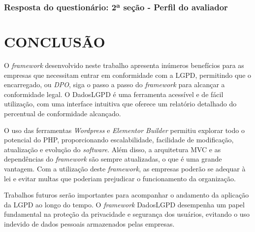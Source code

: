\documentclass[
	12pt,				%
	openright,			%
	oneside,			%
	a4paper,			%
	english,			%
	french,				%
	spanish,			%
	brazil,				%
	]{abntex2}
\begin{document}
 \subsection{Resposta do questionário: 2ª seção - Perfil do avaliador}







 \chapter{CONCLUSÃO}
 \label{ch: conclusao}
O \textit{framework} desenvolvido neste trabalho apresenta inúmeros benefícios para as empresas que necessitam entrar em conformidade com a LGPD, permitindo que o encarregado, ou \textit{DPO}, siga o passo a passo do \textit{framework} para alcançar a conformidade legal. O DadosLGPD é uma ferramenta acessível e de fácil utilização, com uma interface intuitiva que oferece um relatório detalhado do percentual de conformidade alcançado.

O uso das ferramentas \textit{Wordpress} e \textit{Elementor Builder} permitiu explorar todo o potencial do PHP, proporcionando escalabilidade, facilidade de modificação, atualização e evolução do \textit{software}. Além disso, a arquitetura MVC e as dependências do \textit{framework} são sempre atualizadas, o que é uma grande vantagem. Com a utilização deste \textit{framework}, as empresas poderão se adequar à lei e evitar multas que poderiam prejudicar o funcionamento da organização.

Trabalhos futuros serão importantes para acompanhar o andamento da aplicação da LGPD ao longo do tempo. O \textit{framework} DadosLGPD desempenha um papel fundamental na proteção da privacidade e segurança dos usuários, evitando o uso indevido de dados pessoais armazenados pelas empresas.




% 

\postextual
\end{document}
